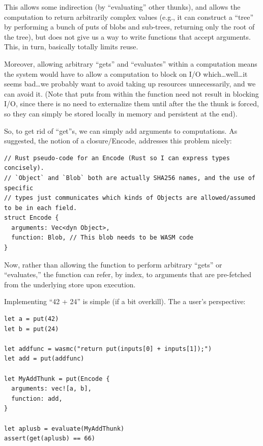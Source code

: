 \documentclass{article}
\newcommand{\bs}{\vspace{\baselineskip}}
\begin{document}
\bs

This allows some indirection (by ``evaluating'' other thunks), and
allows the computation to return arbitrarily complex values (e.g., it
can construct a ``tree'' by performing a bunch of puts of blobs and
sub-trees, returning only the root of the tree), but does not give us
a way to write functions that accept arguments. This, in turn,
basically totally limits reuse.

\bs

Moreover, allowing arbitrary ``gets'' and ``evaluates'' within a
computation means the system would have to allow a computation to
block on I/O which\ldots well\ldots it seems bad\ldots we probably want to
avoid taking up resources unnecessarily, and we can avoid it. (Note
that puts from within the function need not result in blocking I/O,
since there is no need to externalize them until after the the thunk
is forced, so they can simply be stored locally in memory and
persistent at the end).

\bs

So, to get rid of ``get''s, we can simply add arguments to computations. As suggested, the notion of a closure/Encode, addresses this problem nicely:

\begin{verbatim}
// Rust pseudo-code for an Encode (Rust so I can express types concisely).
// `Object` and `Blob` both are actually SHA256 names, and the use of specific
// types just communicates which kinds of Objects are allowed/assumed to be in each field.
struct Encode {
  arguments: Vec<dyn Object>,
  function: Blob, // This blob needs to be WASM code
}
\end{verbatim}

Now, rather than allowing the function to perform arbitrary ``gets''
or ``evaluates,'' the function can refer, by index, to arguments that
are pre-fetched from the underlying store upon execution.

\bs

Implementing ``42 + 24'' is simple (if a bit overkill). The a user's perspective:

\bs

\begin{verbatim}
let a = put(42)
let b = put(24)

let addfunc = wasmc("return put(inputs[0] + inputs[1]);")
let add = put(addfunc)

let MyAddThunk = put(Encode {
  arguments: vec![a, b],
  function: add,
}

let aplusb = evaluate(MyAddThunk)
assert(get(aplusb) == 66)
\end{verbatim}
\end{document}
